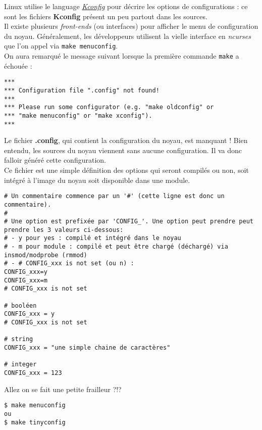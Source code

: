 \documentclass[a4paper]{article}
\begin{document}
Linux utilise le language \textit{\href{https://www.kernel.org/doc/Documentation/kbuild/kconfig-language.txt}{Kconfig}} pour décrire les options de configurations : ce sont les fichiers \textbf{Kconfig} présent un peu partout dans les sources.\\

Il existe plusieurs \textit{front-ends} (ou interfaces) pour afficher le menu de configuration du noyau. Généralement, les développeurs utilisent la vielle interface en \textit{ncurses} que l'on appel via \lstset{language=sh}\lstinline{make menuconfig}.\\

On aura remarqué le message suivant lorsque la première commande \lstset{language=sh}\lstinline{make} a échouée :
\begin{verbatim}
***
*** Configuration file ".config" not found!
***
*** Please run some configurator (e.g. "make oldconfig" or
*** "make menuconfig" or "make xconfig").
***
\end{verbatim}
Le fichier \textbf{.config}, qui contient la configuration du noyau, est manquant ! Bien entendu, les sources du noyau viennent sans aucune configuration. Il va donc falloir généré cette configuration.\\

Ce fichier est une simple définition des options qui seront compilés ou non, soit intégré à l'image du noyau soit disponible dans une module.
\begin{verbatim}
# Un commentaire commence par un '#' (cette ligne est donc un commentaire).
#
# Une option est prefixée par 'CONFIG_'. Une option peut prendre peut prendre les 3 valeurs ci-dessous:
# - y pour yes : compilé et intégré dans le noyau
# - m pour module : compilé et peut être chargé (déchargé) via insmod/modprobe (rmmod)
# - # CONFIG_xxx is not set (ou n) : 
CONFIG_xxx=y
CONFIG_xxx=m
# CONFIG_xxx is not set

# booléen
CONFIG_xxx = y
# CONFIG_xxx is not set

# string
CONFIG_xxx = "une simple chaine de caractères"

# integer
CONFIG_xxx = 123
\end{verbatim}

Allez on se fait une petite frailleur ?!?
\begin{verbatim}
$ make menuconfig
ou
$ make tinyconfig
\end{verbatim}
\end{document}
